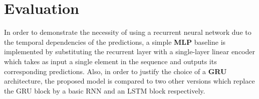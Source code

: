 


\section{Evaluation}\label{sec:nn_eval}

In order to demonstrate the necessity of using a recurrent neural network due to the temporal dependencies of the predictions, a simple \textbf{MLP} baseline is implemented by substituting the recurrent layer with a single-layer linear encoder which takes as input a single element in the sequence and outputs its corresponding predictions.
Also, in order to justify the choice of a \textbf{GRU} architecture, the proposed model is compared to two other versions which replace the GRU block by a basic RNN \cite{cRNN} and an LSTM \cite{cLSTM} block respectively.

